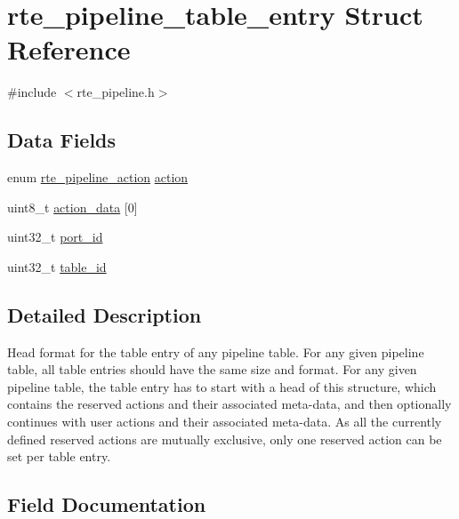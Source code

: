 \hypertarget{structrte__pipeline__table__entry}{}\section{rte\+\_\+pipeline\+\_\+table\+\_\+entry Struct Reference}
\label{structrte__pipeline__table__entry}


{\ttfamily \#include $<$rte\+\_\+pipeline.\+h$>$}

\subsection*{Data Fields}
\begin{DoxyCompactItemize}
\item 
enum \hyperlink{rte__pipeline_8h_a6376b240935404d998f003d113651572}{rte\+\_\+pipeline\+\_\+action} \hyperlink{structrte__pipeline__table__entry_ab65480a4c6171d9ea813e0b1be3afef2}{action}
\item 
uint8\+\_\+t \hyperlink{structrte__pipeline__table__entry_aa5ad05f37ac81926ffee6f7168606712}{action\+\_\+data} \mbox{[}0\mbox{]}
\item 
uint32\+\_\+t \hyperlink{structrte__pipeline__table__entry_a6f54b893342775cdf092c6646e57c83b}{port\+\_\+id}
\item 
uint32\+\_\+t \hyperlink{structrte__pipeline__table__entry_a4783596f73bb7e535d78875dbf3397b0}{table\+\_\+id}
\end{DoxyCompactItemize}


\subsection{Detailed Description}
Head format for the table entry of any pipeline table. For any given pipeline table, all table entries should have the same size and format. For any given pipeline table, the table entry has to start with a head of this structure, which contains the reserved actions and their associated meta-\/data, and then optionally continues with user actions and their associated meta-\/data. As all the currently defined reserved actions are mutually exclusive, only one reserved action can be set per table entry. 

\subsection{Field Documentation}
\hypertarget{structrte__pipeline__table__entry_ab65480a4c6171d9ea813e0b1be3afef2}{}
